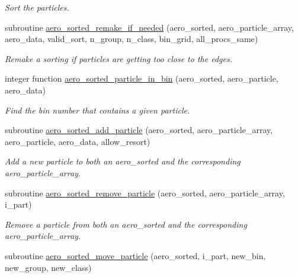 \begin{DoxyCompactItemize}
\begin{DoxyCompactList}\small\item\em Sort the particles. \end{DoxyCompactList}\item 
subroutine \mbox{\hyperlink{namespacepmc__aero__sorted_a7d7a0e73c0725fe40ed2ec64c16455db}{aero\+\_\+sorted\+\_\+remake\+\_\+if\+\_\+needed}} (aero\+\_\+sorted, aero\+\_\+particle\+\_\+array, aero\+\_\+data, valid\+\_\+sort, n\+\_\+group, n\+\_\+class, bin\+\_\+grid, all\+\_\+procs\+\_\+same)
\begin{DoxyCompactList}\small\item\em Remake a sorting if particles are getting too close to the edges. \end{DoxyCompactList}\item 
integer function \mbox{\hyperlink{namespacepmc__aero__sorted_a00a9d9ddcf3ae8d7a793c6a3a6da08d7}{aero\+\_\+sorted\+\_\+particle\+\_\+in\+\_\+bin}} (aero\+\_\+sorted, aero\+\_\+particle, aero\+\_\+data)
\begin{DoxyCompactList}\small\item\em Find the bin number that contains a given particle. \end{DoxyCompactList}\item 
subroutine \mbox{\hyperlink{namespacepmc__aero__sorted_ab76ef898301b54001fdfdfb0ae346bbe}{aero\+\_\+sorted\+\_\+add\+\_\+particle}} (aero\+\_\+sorted, aero\+\_\+particle\+\_\+array, aero\+\_\+particle, aero\+\_\+data, allow\+\_\+resort)
\begin{DoxyCompactList}\small\item\em Add a new particle to both an aero\+\_\+sorted and the corresponding aero\+\_\+particle\+\_\+array. \end{DoxyCompactList}\item 
subroutine \mbox{\hyperlink{namespacepmc__aero__sorted_a3e4e18cdf33430088d88a85c00c55ed8}{aero\+\_\+sorted\+\_\+remove\+\_\+particle}} (aero\+\_\+sorted, aero\+\_\+particle\+\_\+array, i\+\_\+part)
\begin{DoxyCompactList}\small\item\em Remove a particle from both an aero\+\_\+sorted and the corresponding aero\+\_\+particle\+\_\+array. \end{DoxyCompactList}\item 
subroutine \mbox{\hyperlink{namespacepmc__aero__sorted_a19dc894a59b6367f28ef65ddadeede55}{aero\+\_\+sorted\+\_\+move\+\_\+particle}} (aero\+\_\+sorted, i\+\_\+part, new\+\_\+bin, new\+\_\+group, new\+\_\+class)

\end{DoxyCompactItemize}
